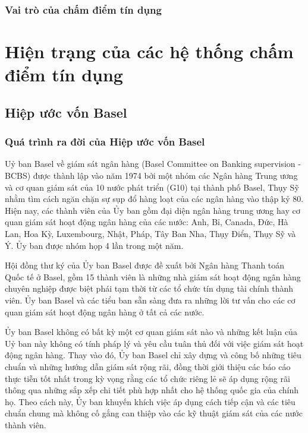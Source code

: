 \subsubsection{Vai trò của chấm điểm tín dụng}

\section{Hiện trạng của các hệ thống chấm điểm tín dụng}
\subsection{Hiệp ước vốn Basel}
\subsubsection{Quá trình ra đời của Hiệp ước vốn Basel}

Uỷ ban Basel về giám sát ngân hàng (Basel Committee on Banking supervision - BCBS) được thành lập vào năm 1974 bởi một nhóm các Ngân hàng Trung ương và cơ quan giám sát của 10 nước phát triển (G10) tại thành phố Basel, Thụy Sỹ nhằm tìm cách ngăn chặn sự sụp đổ hàng loạt của các ngân hàng vào thập kỷ 80. Hiện nay, các thành viên của Ủy ban gồm đại diện ngân hàng trung ương hay cơ quan giám sát hoạt động ngân hàng của các nước: Anh, Bỉ, Canada, Đức, Hà Lan, Hoa Kỳ, Luxembourg, Nhật, Pháp, Tây Ban Nha, Thụy Điển, Thụy Sỹ và Ý. Ủy ban được nhóm họp 4 lần trong một năm.

Hội đồng thư ký của Ủy ban Basel được đề xuất bởi Ngân hàng Thanh toán Quốc tế ở Basel, gồm 15 thành viên là những nhà giám sát hoạt động ngân hàng chuyên nghiệp được biệt phái tạm thời từ các tổ chức tín dụng tài chính thành viên. Ủy ban Basel và các tiểu ban sẵn sàng đưa ra những lời tư vấn cho các cơ quan giám sát hoạt động ngân hàng ở tất cả các nước.

Ủy ban Basel không có bất kỳ một cơ quan giám sát nào và những kết luận của Uỷ ban này không có tính pháp lý và yêu cầu tuân thủ đối với việc giám sát hoạt động ngân hàng. Thay vào đó, Ủy ban Basel chỉ xây dựng và công bố những tiêu chuẩn và những hướng dẫn giám sát rộng rãi, đồng thời giới thiệu các báo cáo thực tiễn tốt nhất trong kỳ vọng rằng các tổ chức riêng lẻ sẽ áp dụng rộng rãi thông qua những sắp xếp chi tiết phù hợp nhất cho hệ thống quốc gia của chính họ. Theo cách này, Ủy ban khuyến khích việc áp dụng cách tiếp cận và các tiêu chuẩn chung mà không cố gắng can thiệp vào các kỹ thuật giám sát của các nước thành viên.

